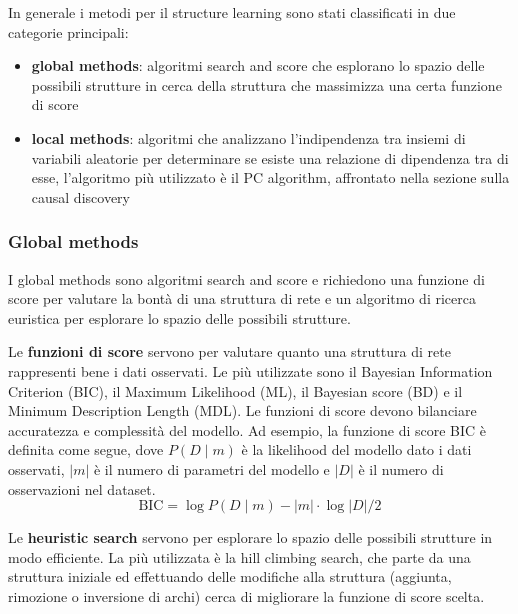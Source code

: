 In generale i metodi per il structure learning sono stati classificati in due categorie principali:
\begin{itemize}[topsep=0pt]
	\item \textbf{global methods}: algoritmi search and score che esplorano lo spazio delle possibili strutture in cerca
	della struttura che massimizza una certa funzione di score
	\item \textbf{local methods}: algoritmi che analizzano l'indipendenza tra insiemi di variabili aleatorie per determinare
	se esiste una relazione di dipendenza tra di esse, l'algoritmo più utilizzato è il PC algorithm, affrontato nella sezione
	sulla causal discovery
\end{itemize}

\subsubsection*{Global methods}
I global methods sono algoritmi search and score e richiedono una funzione di score per valutare la bontà di una struttura
di rete e un algoritmo di ricerca euristica per esplorare lo spazio delle possibili strutture.

Le \textbf{funzioni di score} servono per valutare quanto una struttura di rete rappresenti bene i dati osservati. Le più
utilizzate sono il Bayesian Information Criterion (BIC), il Maximum Likelihood (ML), il Bayesian score (BD) e il Minimum
Description Length (MDL). Le funzioni di score devono bilanciare accuratezza e complessità del modello. Ad esempio, la funzione
di score BIC è definita come segue,  dove \(P(D \mid m)\) è la likelihood del modello dato i dati osservati, \(|m|\) è il numero
di parametri del modello e \(|D|\) è il numero di osservazioni nel dataset.
\[\text{BIC} = \log P(D \mid m) - |m| \cdot \log |D| / 2\]

Le \textbf{heuristic search} servono per esplorare lo spazio delle possibili strutture in modo efficiente. La più utilizzata
è la hill climbing search, che parte da una struttura iniziale ed effettuando delle modifiche alla struttura (aggiunta,
rimozione o inversione di archi) cerca di migliorare la funzione di score scelta.
